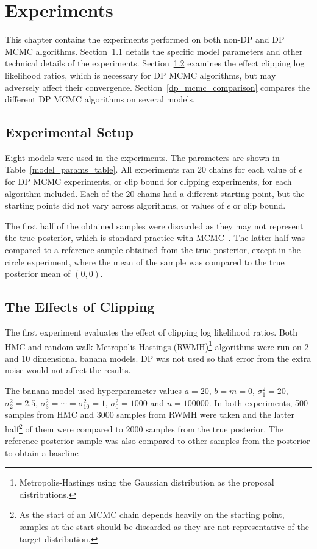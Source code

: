 \documentclass[english,twoside,openright]{HYgraduMLDS}
\begin{document}
\chapter{Experiments}\label{experiment_chapter}

This chapter contains the experiments performed on both non-DP and DP MCMC
algorithms. Section~\ref{experiment_setup} details the specific model parameters
and other technical details of the experiments. Section~\ref{clipping_experiments}
examines the effect clipping log likelihood ratios, which is necessary for
DP MCMC algorithms, but may adversely affect their convergence.
Section~\ref{dp_mcmc_comparison} compares the different DP MCMC algorithms
on several models.

\section{Experimental Setup}\label{experiment_setup}

Eight models were used in the experiments. The parameters are shown in
Table~\ref{model_params_table}. All experiments ran 20 chains for each value
of \(\epsilon\) for DP MCMC experiments, or clip bound for clipping experiments,
for each algorithm included. Each of the
20 chains had a different starting point, but the starting points did
not vary across algorithms, or values of \(\epsilon\) or clip bound.

The first half of the obtained samples were discarded as they may not represent
the true posterior, which is standard practice with MCMC~\cite{BDA}. The
latter half was compared to a reference sample obtained from the true posterior,
except in the circle experiment, where the mean of the sample was compared to
the true posterior mean of \((0,0)\).



\section{The Effects of Clipping}\label{clipping_experiments}

The first experiment evaluates the effect of clipping log likelihood ratios.
Both HMC and random walk Metropolis-Hastings (RWMH)\footnote{Metropolis-Hastings using the Gaussian
distribution as the proposal distributions.}
algorithms were run on 2 and 10 dimensional banana models.
DP was not used so that error from the extra noise would not affect the results.

The banana model used hyperparameter values \(a = 20\), \(b = m = 0\), 
\(\sigma_1^2 = 20\), \(\sigma_2^2 = 2.5\), \(\sigma_3^2 = \dotsb = \sigma_{10}^2 = 1\),
\(\sigma_0^2 = 1000\) and \(n = 100000\).
In both experiments, 500 samples from HMC and 3000 samples from RWMH were taken
and the latter half\footnote{As the start of an MCMC chain depends heavily on the 
starting point, samples at the start should be discarded as they are not representative 
of the target distribution.} of them were
compared to 2000 samples from the true posterior. The reference posterior sample 
was also compared to other samples from the posterior to obtain a baseline 
\end{document}
